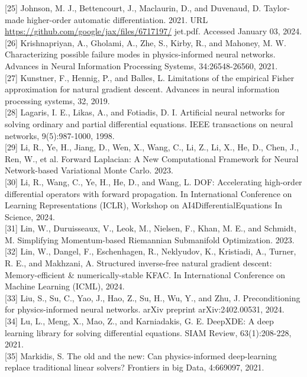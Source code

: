 \documentclass[10pt]{article}
\begin{document}
[25] Johnson, M. J., Bettencourt, J., Maclaurin, D., and Duvenaud, D. Taylor-made higher-order automatic differentiation. 2021. URL \href{https://github.com/google/jax/files/6717197/}{https://github.com/google/jax/files/6717197/} jet.pdf. Accessed January 03, 2024.\\[0pt]
[26] Krishnapriyan, A., Gholami, A., Zhe, S., Kirby, R., and Mahoney, M. W. Characterizing possible failure modes in physics-informed neural networks. Advances in Neural Information Processing Systems, 34:26548-26560, 2021.\\[0pt]
[27] Kunstner, F., Hennig, P., and Balles, L. Limitations of the empirical Fisher approximation for natural gradient descent. Advances in neural information processing systems, 32, 2019.\\[0pt]
[28] Lagaris, I. E., Likas, A., and Fotiadis, D. I. Artificial neural networks for solving ordinary and partial differential equations. IEEE transactions on neural networks, 9(5):987-1000, 1998.\\[0pt]
[29] Li, R., Ye, H., Jiang, D., Wen, X., Wang, C., Li, Z., Li, X., He, D., Chen, J., Ren, W., et al. Forward Laplacian: A New Computational Framework for Neural Network-based Variational Monte Carlo. 2023.\\[0pt]
[30] Li, R., Wang, C., Ye, H., He, D., and Wang, L. DOF: Accelerating high-order differential operators with forward propagation. In International Conference on Learning Representations (ICLR), Workshop on AI4DifferentialEquations In Science, 2024.\\[0pt]
[31] Lin, W., Duruisseaux, V., Leok, M., Nielsen, F., Khan, M. E., and Schmidt, M. Simplifying Momentum-based Riemannian Submanifold Optimization. 2023.\\[0pt]
[32] Lin, W., Dangel, F., Eschenhagen, R., Neklyudov, K., Kristiadi, A., Turner, R. E., and Makhzani, A. Structured inverse-free natural gradient descent: Memory-efficient \& numerically-stable KFAC. In International Conference on Machine Learning (ICML), 2024.\\[0pt]
[33] Liu, S., Su, C., Yao, J., Hao, Z., Su, H., Wu, Y., and Zhu, J. Preconditioning for physics-informed neural networks. arXiv preprint arXiv:2402.00531, 2024.\\[0pt]
[34] Lu, L., Meng, X., Mao, Z., and Karniadakis, G. E. DeepXDE: A deep learning library for solving differential equations. SIAM Review, 63(1):208-228, 2021.\\[0pt]
[35] Markidis, S. The old and the new: Can physics-informed deep-learning replace traditional linear solvers? Frontiers in big Data, 4:669097, 2021.\\[0pt]
\end{document}
